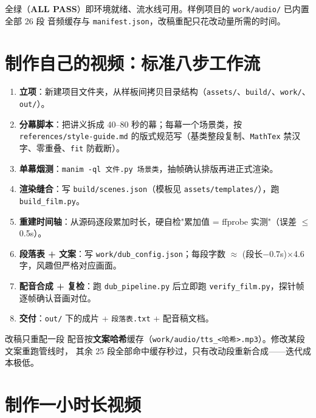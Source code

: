 \documentclass[12pt,a4paper]{ctexart}
\newcommand{\code}[1]{\texttt{\small #1}}
\begin{document}
全绿（\textbf{ALL PASS}）即环境就绪、流水线可用。样例项目的 \code{work/audio/} 已内置全部 26 段
音频缓存与 \code{manifest.json}，改稿重配只花改动量所需的时间。

\section{制作自己的视频：标准八步工作流}

\begin{enumerate}
    \item \textbf{立项}：新建项目文件夹，从样板间拷贝目录结构（\code{assets/}、\code{build/}、\code{work/}、\code{out/}）。
    \item \textbf{分幕脚本}：把讲义拆成 40--80 秒的幕；每幕一个场景类，按 \code{references/style-guide.md}
    的版式规范写（基类整段复制、\code{MathTex} 禁汉字、零重叠、\code{fit} 防截断）。
    \item \textbf{单幕烟测}：\code{manim -ql 文件.py 场景类}，抽帧确认排版再进正式渲染。
    \item \textbf{渲染缝合}：写 \code{build/scenes.json}（模板见 \code{assets/templates/}），跑 \code{build\_film.py}。
    \item \textbf{重建时间轴}：从源码逐段累加时长，硬自检"累加值 = ffprobe 实测"（误差 $\leq$ 0.5s）。
    \item \textbf{段落表 + 文案}：写 \code{work/dub\_config.json}；每段字数 $\approx$ (段长$-0.7$s)$\times$4.6 字，风趣但严格对应画面。
    \item \textbf{配音合成 + 复检}：跑 \code{dub\_pipeline.py} 后立即跑 \code{verify\_film.py}，探针帧逐帧确认音画对位。
    \item \textbf{交付}：\code{out/} 下的成片 + \code{段落表.txt} + 配音稿文档。
\end{enumerate}

\begin{infobox}{改稿只重配一段}
配音按\textbf{文案哈希}缓存（\code{work/audio/tts\_<哈希>.mp3}）。修改某段文案重跑管线时，
其余 25 段全部命中缓存秒过，只有改动段重新合成——迭代成本极低。
\end{infobox}

\section{制作一小时长视频}\label{sec:long}
\end{document}
